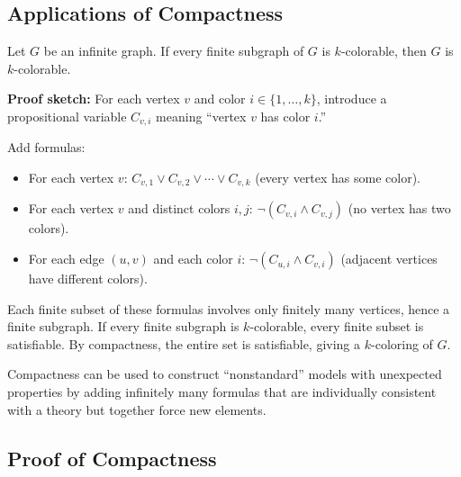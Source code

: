 \subsection{Applications of Compactness}

\begin{example}
Let $G$ be an infinite graph. If every finite subgraph of $G$ is $k$-colorable,
then $G$ is $k$-colorable.

\textbf{Proof sketch:} For each vertex $v$ and color $i \in \{1, \dots, k\}$,
introduce a propositional variable $C_{v,i}$ meaning ``vertex $v$ has color $i$.''

Add formulas:
\begin{itemize}
  \item For each vertex $v$: $C_{v,1} \vee C_{v,2} \vee \cdots \vee C_{v,k}$
        (every vertex has some color).
  \item For each vertex $v$ and distinct colors $i, j$:
        $\neg(C_{v,i} \wedge C_{v,j})$ (no vertex has two colors).
  \item For each edge $(u, v)$ and each color $i$:
        $\neg(C_{u,i} \wedge C_{v,i})$ (adjacent vertices have different colors).
\end{itemize}

Each finite subset of these formulas involves only finitely many vertices, hence
a finite subgraph. If every finite subgraph is $k$-colorable, every finite subset
is satisfiable. By compactness, the entire set is satisfiable, giving a
$k$-coloring of $G$.
\end{example}

\begin{example}
Compactness can be used to construct ``nonstandard'' models with unexpected
properties by adding infinitely many formulas that are individually consistent
with a theory but together force new elements.
\end{example}

\subsection{Proof of Compactness}

